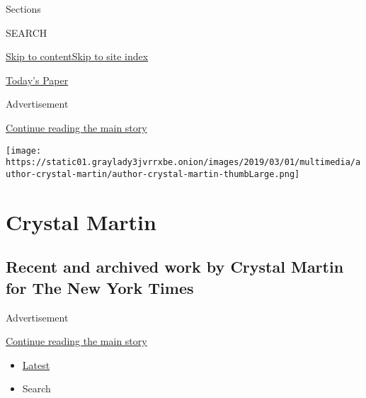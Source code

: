 Sections

SEARCH

\protect\hyperlink{site-content}{Skip to
content}\protect\hyperlink{site-index}{Skip to site index}

\href{https://myaccount.nytimes3xbfgragh.onion/auth/login?response_type=cookie\&client_id=vi}{}

\href{https://www.nytimes3xbfgragh.onion/section/todayspaper}{Today's
Paper}

Advertisement

\protect\hyperlink{after-top}{Continue reading the main story}

\texttt{[image: https://static01.graylady3jvrrxbe.onion/images/2019/03/01/multimedia/author-crystal-martin/author-crystal-martin-thumbLarge.png]}

\hypertarget{crystal-martin}{%
\section{Crystal Martin}\label{crystal-martin}}

\hypertarget{recent-and-archived-work-by-crystal-martin-for-the-new-york-times}{%
\subsection{Recent and archived work by Crystal Martin for The New York
Times}\label{recent-and-archived-work-by-crystal-martin-for-the-new-york-times}}

Advertisement

\protect\hyperlink{after-mid1}{Continue reading the main story}

\begin{itemize}
\tightlist
\item
  \protect\hyperlink{stream-panel}{Latest}
\item
  Search
\end{itemize}

